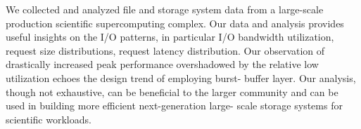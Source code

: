 
We collected and analyzed file and storage system data from a large-scale
production scientific supercomputing complex. Our data and analysis provides
useful insights on the I/O patterns, in particular I/O bandwidth utilization,
request size distributions, request latency distribution. Our observation of
drastically increased peak performance overshadowed by the relative low
utilization echoes the design trend of employing burst- buffer layer. Our
analysis, though not exhaustive, can be beneficial to the
larger community and can be used in building more efficient next-generation
large- scale storage systems for scientific workloads.
